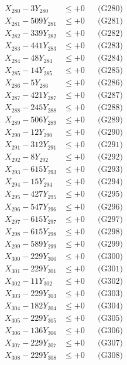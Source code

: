 \documentclass[a4paper,10pt]{article}
\begin{document}
{\begin{align}
X_{280} - 3Y_{280} &\leq +0 && \text{(G280)} \\
\allowbreak
X_{281} - 509Y_{281} &\leq +0 && \text{(G281)} \\
X_{282} - 339Y_{282} &\leq +0 && \text{(G282)} \\
X_{283} - 441Y_{283} &\leq +0 && \text{(G283)} \\
X_{284} - 48Y_{284} &\leq +0 && \text{(G284)} \\
X_{285} - 14Y_{285} &\leq +0 && \text{(G285)} \\
X_{286} - 5Y_{286} &\leq +0 && \text{(G286)} \\
X_{287} - 421Y_{287} &\leq +0 && \text{(G287)} \\
X_{288} - 245Y_{288} &\leq +0 && \text{(G288)} \\
X_{289} - 506Y_{289} &\leq +0 && \text{(G289)} \\
X_{290} - 12Y_{290} &\leq +0 && \text{(G290)} \\
\allowbreak
X_{291} - 312Y_{291} &\leq +0 && \text{(G291)} \\
X_{292} - 8Y_{292} &\leq +0 && \text{(G292)} \\
X_{293} - 615Y_{293} &\leq +0 && \text{(G293)} \\
X_{294} - 15Y_{294} &\leq +0 && \text{(G294)} \\
X_{295} - 427Y_{295} &\leq +0 && \text{(G295)} \\
X_{296} - 547Y_{296} &\leq +0 && \text{(G296)} \\
X_{297} - 615Y_{297} &\leq +0 && \text{(G297)} \\
X_{298} - 615Y_{298} &\leq +0 && \text{(G298)} \\
X_{299} - 589Y_{299} &\leq +0 && \text{(G299)} \\
X_{300} - 229Y_{300} &\leq +0 && \text{(G300)} \\
\allowbreak
X_{301} - 229Y_{301} &\leq +0 && \text{(G301)} \\
X_{302} - 11Y_{302} &\leq +0 && \text{(G302)} \\
X_{303} - 229Y_{303} &\leq +0 && \text{(G303)} \\
X_{304} - 182Y_{304} &\leq +0 && \text{(G304)} \\
X_{305} - 229Y_{305} &\leq +0 && \text{(G305)} \\
X_{306} - 136Y_{306} &\leq +0 && \text{(G306)} \\
X_{307} - 229Y_{307} &\leq +0 && \text{(G307)} \\
X_{308} - 229Y_{308} &\leq +0 && \text{(G308)} \\

\end{align}}
\end{document}
